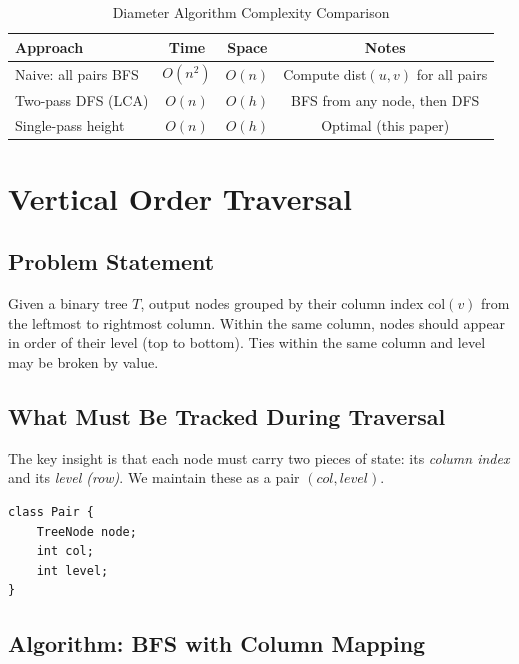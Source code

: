 \documentclass[10pt,journal,compsoc,onecolumn]{IEEEtran}
\begin{document}
\begin{table}[h]
\centering
\caption{Diameter Algorithm Complexity Comparison}
\begin{tabular}{lccc}
\toprule
\textbf{Approach} & \textbf{Time} & \textbf{Space} & \textbf{Notes} \\
\midrule
Naive: all pairs BFS & $O(n^2)$ & $O(n)$ & Compute dist$(u,v)$ for all pairs \\
Two-pass DFS (LCA) & $O(n)$ & $O(h)$ & BFS from any node, then DFS \\
Single-pass height & $O(n)$ & $O(h)$ & Optimal (this paper) \\
\bottomrule
\end{tabular}
\end{table}

\section{Vertical Order Traversal}
\label{sec:vertical}

\subsection{Problem Statement}

Given a binary tree $T$, output nodes grouped by their column index $\text{col}(v)$ from the leftmost to rightmost column. Within the same column, nodes should appear in order of their level (top to bottom). Ties within the same column and level may be broken by value.

\subsection{What Must Be Tracked During Traversal}

The key insight is that each node must carry two pieces of state: its \emph{column index} and its \emph{level (row)}. We maintain these as a pair $(col, level)$.

\begin{verbatim}
class Pair {
    TreeNode node;
    int col;
    int level;
}
\end{verbatim}

\subsection{Algorithm: BFS with Column Mapping}
\end{document}
